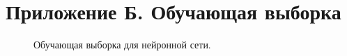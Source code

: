 \section*{Приложение Б. Обучающая выборка}

\begin{figure}[h]
\caption{Обучающая выборка для нейронной сети.}
\label{ris:vibor}
\end{figure}
